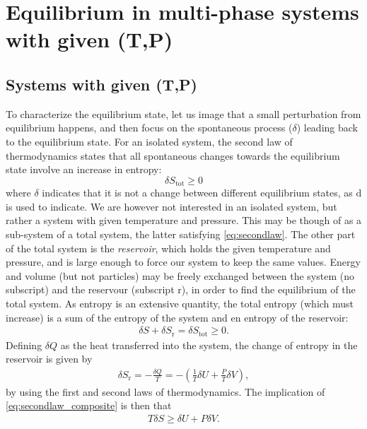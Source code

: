 \documentclass[internal,english]{sintefmemo2012}
\begin{document}
\section{Equilibrium in multi-phase systems with given (T,P)}
\subsection{Systems with given (T,P)}
\label{sec:eq_givenTP}
To characterize the equilibrium state, let us image that a small perturbation from equilibrium happens, and then focus on 
the spontaneous process ($\delta$) leading back to the equilibrium state. 
For an isolated system, the second law of thermodynamics states that all spontaneous changes towards the equilibrium 
state involve an increase in entropy:
\begin{equation}
  \delta S_\text{tot} \geq 0
  \label{eq:secondlaw}
\end{equation}
where $\delta$ indicates that it is not a change between different equilibrium states, as $\mathrm{d}$ is used to indicate. 
We are however not interested in an isolated system, but rather a system with given temperature and pressure. This may be though of as a sub-system of a total 
system, the latter satisfying \eqref{eq:secondlaw}. The other part of the total system is the \textit{reservoir}, which holds the given temperature and 
pressure, and is large enough to force our system to keep the same values. Energy and volume (but not particles) 
may be freely exchanged between the system (no subscript) and 
the reservour (subscript r), in order to find the equilibrium of the total system. As entropy is an extensive quantity, the total entropy (which must increase) is 
a sum of the entropy of the system and en entropy of the reservoir:
\begin{align}
  \delta S  + \delta S_\text{r} = \delta S_\text{tot} \geq 0.
  \label{eq:secondlaw_composite}
\end{align}
Defining $\delta Q$ as the heat transferred into the system, the change of entropy in the reservoir is given by
\begin{align}
  \delta S_\text{r} = - \frac{\delta Q}{T} = - \left( \frac{1}{T}\delta U + \frac{P}{T} \delta V \right),
  \label{}
\end{align}
by using the first and second laws of thermodynamics. The implication of \eqref{eq:secondlaw_composite} is then that
\begin{align}
  T \delta S \geq \delta U +  P \delta V.
  \label{eq:TdS}
\end{align}
\end{document}
